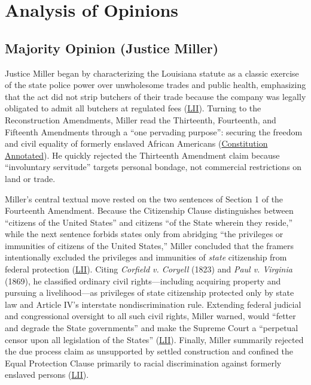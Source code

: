 \documentclass[12pt]{article}
\begin{document}
\section{Analysis of Opinions}

\subsection{Majority Opinion (Justice Miller)}

Justice Miller began by characterizing the Louisiana statute as a classic exercise of the state police power over unwholesome trades and public health, emphasizing that the act did not strip butchers of their trade because the company was legally obligated to admit all butchers at regulated fees (\href{https://www.law.cornell.edu/supremecourt/text/83/36}{LII}). Turning to the Reconstruction Amendments, Miller read the Thirteenth, Fourteenth, and Fifteenth Amendments through a ``one pervading purpose'': securing the freedom and civil equality of formerly enslaved African Americans (\href{https://www.law.cornell.edu/constitution-conan/amendment-14/section-1/slaughter-house}{Constitution Annotated}). He quickly rejected the Thirteenth Amendment claim because ``involuntary servitude'' targets personal bondage, not commercial restrictions on land or trade.

Miller's central textual move rested on the two sentences of Section 1 of the Fourteenth Amendment. Because the Citizenship Clause distinguishes between ``citizens of the United States'' and citizens ``of the State wherein they reside,'' while the next sentence forbids states only from abridging ``the privileges or immunities of citizens of the United States,'' Miller concluded that the framers intentionally excluded the privileges and immunities of \textit{state} citizenship from federal protection (\href{https://www.law.cornell.edu/supremecourt/text/83/36}{LII}). Citing \textit{Corfield v. Coryell} (1823) and \textit{Paul v. Virginia} (1869), he classified ordinary civil rights---including acquiring property and pursuing a livelihood---as privileges of state citizenship protected only by state law and Article IV's interstate nondiscrimination rule. Extending federal judicial and congressional oversight to all such civil rights, Miller warned, would ``fetter and degrade the State governments'' and make the Supreme Court a ``perpetual censor upon all legislation of the States'' (\href{https://www.law.cornell.edu/supremecourt/text/83/36}{LII}). Finally, Miller summarily rejected the due process claim as unsupported by settled construction and confined the Equal Protection Clause primarily to racial discrimination against formerly enslaved persons (\href{https://www.law.cornell.edu/supremecourt/text/83/36}{LII}).
\end{document}
